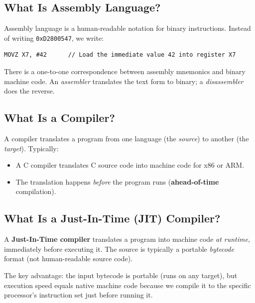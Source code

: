 \documentclass[11pt,letterpaper]{article}
\begin{document}
\subsection{What Is Assembly Language?}

Assembly language is a human-readable notation for binary instructions. Instead of writing \texttt{0xD2800547}, we write:

\begin{lstlisting}[style=asm]
MOVZ X7, #42      // Load the immediate value 42 into register X7
\end{lstlisting}

\noindent There is a one-to-one correspondence between assembly mnemonics and binary machine code. An \emph{assembler} translates the text form to binary; a \emph{disassembler} does the reverse.

\subsection{What Is a Compiler?}

A compiler translates a program from one language (the \emph{source}) to another (the \emph{target}). Typically:
\begin{itemize}
    \item A C compiler translates C source code into machine code for x86 or ARM.
    \item The translation happens \emph{before} the program runs (\textbf{ahead-of-time} compilation).
\end{itemize}

\subsection{What Is a Just-In-Time (JIT) Compiler?}

\begin{definition}
A \textbf{Just-In-Time compiler} translates a program into machine code \emph{at runtime}, immediately before executing it. The source is typically a portable \emph{bytecode} format (not human-readable source code).
\end{definition}

The key advantage: the input bytecode is portable (runs on any target), but execution speed equals native machine code because we compile it to the specific processor's instruction set just before running it.
\end{document}
